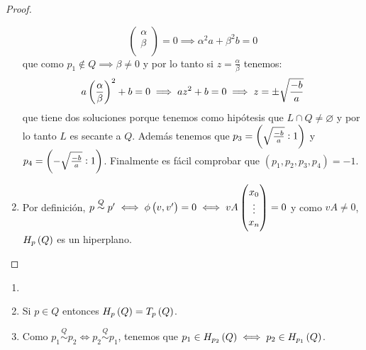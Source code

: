 \begin{proof}
\begin{enumerate}[(1)]
\[\begin{pmatrix}
          \alpha\\
          \beta\\
        \end{pmatrix}=0 \implies \alpha^2 a+\beta^2 b=0 
      \]
      que como $p_1\not\in Q \implies \beta\neq 0$ y por lo tanto si $z=\frac{\alpha}{\beta}$ tenemos:
      \[
        a\left(\frac{\alpha}{\beta}\right)^2 +b =0 \implies az^2 +b=0 \implies z=\pm \sqrt{\frac{-b}{a}}
      \]
      que tiene dos soluciones porque tenemos como hipótesis que $L\cap Q\neq\varnothing$ y por lo tanto
      $L$ es secante a $Q$. Además tenemos que $p_3=\left(\sqrt{\frac{-b}{a}}:1\right)$ y $p_4=\left(-\sqrt{\frac{-b}{a}}:1\right)$.
      Finalmente es fácil comprobar que $(p_1,p_2,p_3,p_4)=-1$.
    \item Por definición, $p \stackrel{Q}{\sim} p' \iff \phi\left( v,v'\right)=0 \iff vA\begin{pmatrix}x_0\\ \vdots\\ x_n\\ \end{pmatrix}=0$
      y como $vA\neq 0$, $H_p\left( Q\right)$ es un hiperplano.
  \end{enumerate}
\end{proof}

\begin{obs}
  \begin{enumerate}[(1)]
    \item []
    \item Si $p\in Q$ entonces $H_p\left( Q\right) = T_p\left( Q\right)$.
    \item Como $p_1 \stackrel{Q}{\sim} p_2 \iff p_2 \stackrel{Q}{\sim} p_1$, tenemos que $p_1\in H_{p_2}\left( Q\right) \iff
      p_2\in H_{p_1}\left( Q\right)$.
  \end{enumerate}
\end{obs}

